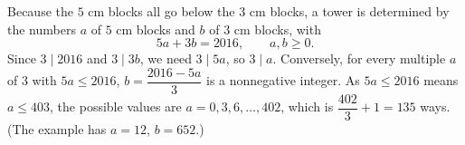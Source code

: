 Because the $5$ cm blocks all go below the $3$ cm blocks, a tower is determined by the numbers $a$ of $5$ cm blocks and $b$ of $3$ cm blocks, with
\[
5a+3b=2016,\qquad a,b\ge0 .
\]
Since $3\mid2016$ and $3\mid3b$, we need $3\mid5a$, so $3\mid a$. Conversely, for every multiple $a$ of $3$ with $5a\le2016$, $b=\dfrac{2016-5a}{3}$ is a nonnegative integer. As $5a\le2016$ means $a\le403$, the possible values are $a=0,3,6,\dots,402$, which is $\dfrac{402}{3}+1=\boxed{135}$ ways. (The example has $a=12$, $b=652$.)
